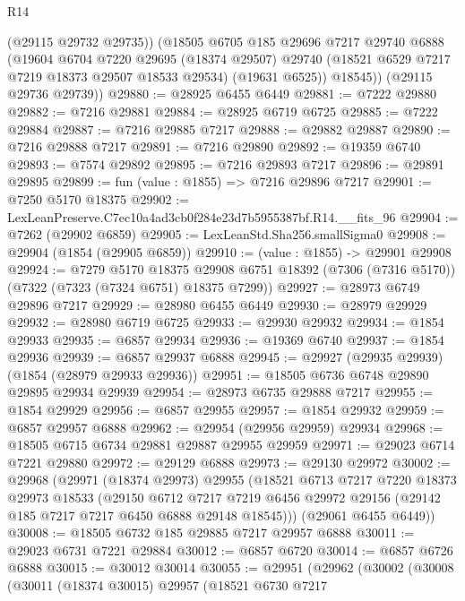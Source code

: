 \begin{lexlean}{R14}
\begin{coremodule}
          (@29115 @29732 @29735))
        (@18505
          @6705
          @185
          @29696
          @7217
          @29740
          @6888
          (@19604
            @6704
            @7220
            @29695
            (@18374 @29507)
            @29740
            (@18521 @6529 @7217 @7219 @18373 @29507 @18533 @29534)
            (@19631 @6525))
          @18545))
      (@29115 @29736 @29739))
@29880 := @28925 @6455 @6449
@29881 := @7222 @29880
@29882 := @7216 @29881
@29884 := @28925 @6719 @6725
@29885 := @7222 @29884
@29887 := @7216 @29885 @7217
@29888 := @29882 @29887
@29890 := @7216 @29888 @7217
@29891 := @7216 @29890
@29892 := @19359 @6740
@29893 := @7574 @29892
@29895 := @7216 @29893 @7217
@29896 := @29891 @29895
@29899 := fun (value : @1855) => @7216 @29896 @7217
@29901 := @7250 @5170 @18375
@29902 := LexLeanPreserve.C7ec10a4ad3cb0f284e23d7b5955387bf.R14.__fits_96
@29904 := @7262 (@29902 @6859)
@29905 := LexLeanStd.Sha256.smallSigma0
@29908 := @29904 (@1854 (@29905 @6859))
@29910 := (value : @1855) -> @29901 @29908
@29924 := @7279
    @5170
    @18375
    @29908
    @6751
    @18392
    (@7306 (@7316 @5170))
    (@7322 (@7323 (@7324 @6751) @18375 @7299))
@29927 := @28973 @6749 @29896 @7217
@29929 := @28980 @6455 @6449
@29930 := @28979 @29929
@29932 := @28980 @6719 @6725
@29933 := @29930 @29932
@29934 := @1854 @29933
@29935 := @6857 @29934
@29936 := @19369 @6740
@29937 := @1854 @29936
@29939 := @6857 @29937 @6888
@29945 := @29927 (@29935 @29939) (@1854 (@28979 @29933 @29936))
@29951 := @18505 @6736 @6748 @29890 @29895 @29934 @29939
@29954 := @28973 @6735 @29888 @7217
@29955 := @1854 @29929
@29956 := @6857 @29955
@29957 := @1854 @29932
@29959 := @6857 @29957 @6888
@29962 := @29954 (@29956 @29959) @29934
@29968 := @18505 @6715 @6734 @29881 @29887 @29955 @29959
@29971 := @29023 @6714 @7221 @29880
@29972 := @29129 @6888
@29973 := @29130 @29972
@30002 := @29968
    (@29971
      (@18374 @29973)
      @29955
      (@18521
        @6713
        @7217
        @7220
        @18373
        @29973
        @18533
        (@29150
          @6712
          @7217
          @7219
          @6456
          @29972
          @29156
          (@29142 @185 @7217 @7217 @6450 @6888 @29148 @18545)))
      (@29061 @6455 @6449))
@30008 := @18505 @6732 @185 @29885 @7217 @29957 @6888
@30011 := @29023 @6731 @7221 @29884
@30012 := @6857 @6720
@30014 := @6857 @6726 @6888
@30015 := @30012 @30014
@30055 := @29951
    (@29962
      (@30002
        (@30008
          (@30011
            (@18374 @30015)
            @29957
            (@18521
              @6730
              @7217

\end{coremodule}
\end{lexlean}
